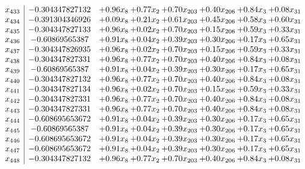\documentclass[8pt]{article}
\begin{document}
\[\begin{array}{c| c c@{\hskip 2pt} c@{\hskip 2pt} c@{\hskip 2pt} c@{\hskip 2pt} c@{\hskip 2pt} c@{\hskip 2pt} }
 x_{433}   &  -0.304347827132 & +  0.96 x_{8} & +  0.77 x_{2} & +  0.70 x_{203} & +  0.40 x_{206} & +  0.84 x_{3} & +  0.08 x_{31}\\
 x_{434}   &  -0.391304346926 & +  0.09 x_{8} & +  0.21 x_{2} & +  0.61 x_{203} & +  0.45 x_{206} & +  0.58 x_{3} & +  0.60 x_{31}\\
 x_{435}   &  -0.304347827133 & +  0.96 x_{8} & +  0.02 x_{2} & +  0.70 x_{203} & +  0.15 x_{206} & +  0.59 x_{3} & +  0.33 x_{31}\\
 x_{436}   &  -0.60869565387 & +  0.91 x_{8} & +  0.04 x_{2} & +  0.39 x_{203} & +  0.30 x_{206} & +  0.17 x_{3} & +  0.65 x_{31}\\
 x_{437}   &  -0.304347826935 & +  0.96 x_{8} & +  0.02 x_{2} & +  0.70 x_{203} & +  0.15 x_{206} & +  0.59 x_{3} & +  0.33 x_{31}\\
 x_{438}   &  -0.304347827331 & +  0.96 x_{8} & +  0.77 x_{2} & +  0.70 x_{203} & +  0.40 x_{206} & +  0.84 x_{3} & +  0.08 x_{31}\\
 x_{439}   &  -0.60869565387 & +  0.91 x_{8} & +  0.04 x_{2} & +  0.39 x_{203} & +  0.30 x_{206} & +  0.17 x_{3} & +  0.65 x_{31}\\
 x_{440}   &  -0.304347827132 & +  0.96 x_{8} & +  0.77 x_{2} & +  0.70 x_{203} & +  0.40 x_{206} & +  0.84 x_{3} & +  0.08 x_{31}\\
 x_{441}   &  -0.304347827134 & +  0.96 x_{8} & +  0.02 x_{2} & +  0.70 x_{203} & +  0.15 x_{206} & +  0.59 x_{3} & +  0.33 x_{31}\\
 x_{442}   &  -0.304347827331 & +  0.96 x_{8} & +  0.77 x_{2} & +  0.70 x_{203} & +  0.40 x_{206} & +  0.84 x_{3} & +  0.08 x_{31}\\
 x_{443}   &  -0.304347827331 & +  0.96 x_{8} & +  0.77 x_{2} & +  0.70 x_{203} & +  0.40 x_{206} & +  0.84 x_{3} & +  0.08 x_{31}\\
 x_{444}   &  -0.608695653672 & +  0.91 x_{8} & +  0.04 x_{2} & +  0.39 x_{203} & +  0.30 x_{206} & +  0.17 x_{3} & +  0.65 x_{31}\\
 x_{445}   &  -0.60869565387 & +  0.91 x_{8} & +  0.04 x_{2} & +  0.39 x_{203} & +  0.30 x_{206} & +  0.17 x_{3} & +  0.65 x_{31}\\
 x_{446}   &  -0.608695653672 & +  0.91 x_{8} & +  0.04 x_{2} & +  0.39 x_{203} & +  0.30 x_{206} & +  0.17 x_{3} & +  0.65 x_{31}\\
 x_{447}   &  -0.608695653672 & +  0.91 x_{8} & +  0.04 x_{2} & +  0.39 x_{203} & +  0.30 x_{206} & +  0.17 x_{3} & +  0.65 x_{31}\\
 x_{448}   &  -0.304347827132 & +  0.96 x_{8} & +  0.77 x_{2} & +  0.70 x_{203} & +  0.40 x_{206} & +  0.84 x_{3} & +  0.08 x_{31}\\

\end{array}\]
\end{document}
